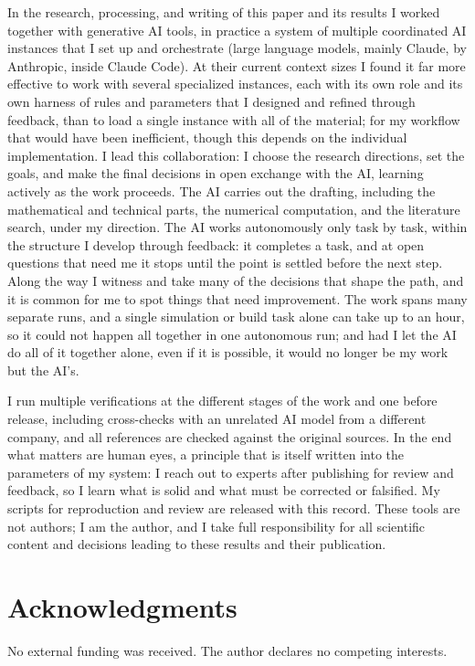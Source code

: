 \documentclass[aps,pra,twocolumn,superscriptaddress,floatfix,nofootinbib]{revtex4-2}
\begin{document}
In the research, processing, and writing of this paper and its results I worked together with generative AI tools, in practice a system of multiple coordinated AI instances that I set up and orchestrate (large language models, mainly Claude, by Anthropic, inside Claude Code). At their current context sizes I found it far more effective to work with several specialized instances, each with its own role and its own harness of rules and parameters that I designed and refined through feedback, than to load a single instance with all of the material; for my workflow that would have been inefficient, though this depends on the individual implementation. I lead this collaboration: I choose the research directions, set the goals, and make the final decisions in open exchange with the AI, learning actively as the work proceeds. The AI carries out the drafting, including the mathematical and technical parts, the numerical computation, and the literature search, under my direction. The AI works autonomously only task by task, within the structure I develop through feedback: it completes a task, and at open questions that need me it stops until the point is settled before the next step. Along the way I witness and take many of the decisions that shape the path, and it is common for me to spot things that need improvement. The work spans many separate runs, and a single simulation or build task alone can take up to an hour, so it could not happen all together in one autonomous run; and had I let the AI do all of it together alone, even if it is possible, it would no longer be my work but the AI's.

I run multiple verifications at the different stages of the work and one before release, including cross-checks with an unrelated AI model from a different company, and all references are checked against the original sources. In the end what matters are human eyes, a principle that is itself written into the parameters of my system: I reach out to experts after publishing for review and feedback, so I learn what is solid and what must be corrected or falsified. My scripts for reproduction and review are released with this record. These tools are not authors; I am the author, and I take full responsibility for all scientific content and decisions leading to these results and their publication.

\section*{Acknowledgments}
No external funding was received. The author declares no competing
interests.
\end{document}
